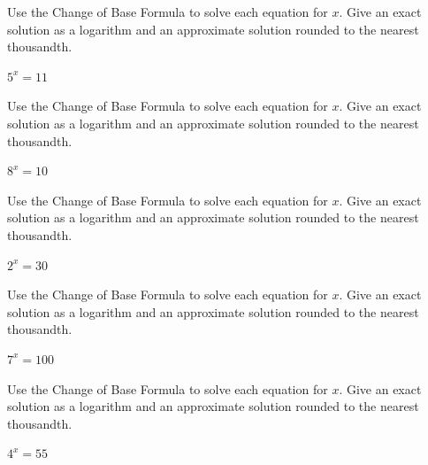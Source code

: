 \documentclass{article}
\newenvironment{practice}[2]{}{}        %
\newcommand{\answer}[1]{}               %
\begin{document}
\begin{practice}{31}{1}
Use the Change of Base Formula to solve each equation for $x$. Give an exact solution as a logarithm and an approximate solution rounded to the nearest thousandth.

$5^x=11$

\answer{$\dfrac{\log11}{\log5}$; 1.490}
\end{practice}

\begin{practice}{32}{1}
Use the Change of Base Formula to solve each equation for $x$. Give an exact solution as a logarithm and an approximate solution rounded to the nearest thousandth.

$8^x=10$

\answer{$\dfrac{\log10}{\log8}$; 1.107}
\end{practice}

\begin{practice}{33}{1}
Use the Change of Base Formula to solve each equation for $x$. Give an exact solution as a logarithm and an approximate solution rounded to the nearest thousandth.

$2^x=30$

\answer{$\dfrac{\log30}{\log2}$; 4.907}
\end{practice}

\begin{practice}{34}{1}
Use the Change of Base Formula to solve each equation for $x$. Give an exact solution as a logarithm and an approximate solution rounded to the nearest thousandth.

$7^x=100$

\answer{$\dfrac{\log100}{\log7}$; 2.367}
\end{practice}

\begin{practice}{35}{1}
Use the Change of Base Formula to solve each equation for $x$. Give an exact solution as a logarithm and an approximate solution rounded to the nearest thousandth.

$4^x=55$

\answer{$\dfrac{\log55}{\log4}$; 2.891}
\end{practice}
\end{document}
